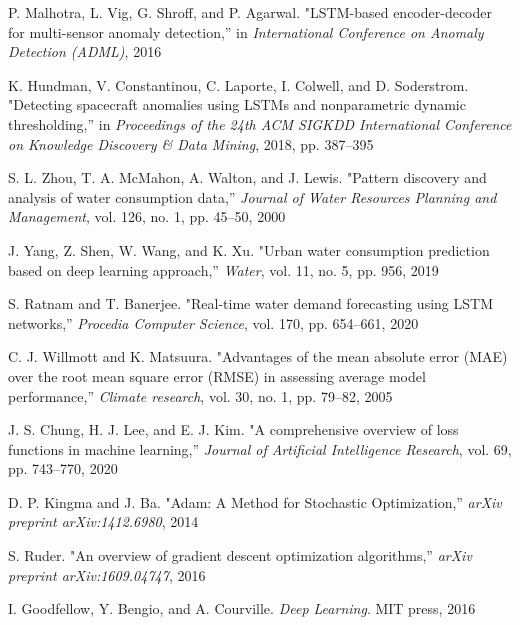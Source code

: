 \begin{thebibliography}{99}
P. Malhotra, L. Vig, G. Shroff, and P. Agarwal. "LSTM-based encoder-decoder for multi-sensor anomaly detection,'' in \textit{International Conference on Anomaly Detection (ADML)}, 2016

K. Hundman, V. Constantinou, C. Laporte, I. Colwell, and D. Soderstrom. "Detecting spacecraft anomalies using LSTMs and nonparametric dynamic thresholding,'' in \textit{Proceedings of the 24th ACM SIGKDD International Conference on Knowledge Discovery \& Data Mining}, 2018, pp. 387--395

S. L. Zhou, T. A. McMahon, A. Walton, and J. Lewis. "Pattern discovery and analysis of water consumption data,'' \textit{Journal of Water Resources Planning and Management}, vol. 126, no. 1, pp. 45--50, 2000

J. Yang, Z. Shen, W. Wang, and K. Xu. "Urban water consumption prediction based on deep learning approach,'' \textit{Water}, vol. 11, no. 5, pp. 956, 2019

S. Ratnam and T. Banerjee. "Real-time water demand forecasting using LSTM networks,'' \textit{Procedia Computer Science}, vol. 170, pp. 654--661, 2020

C. J. Willmott and K. Matsuura. "Advantages of the mean absolute error (MAE) over the root mean square error (RMSE) in assessing average model performance,'' \textit{Climate research}, vol. 30, no. 1, pp. 79--82, 2005

J. S. Chung, H. J. Lee, and E. J. Kim. "A comprehensive overview of loss functions in machine learning,'' \textit{Journal of Artificial Intelligence Research}, vol. 69, pp. 743--770, 2020

D. P. Kingma and J. Ba. "Adam: A Method for Stochastic Optimization,'' \textit{arXiv preprint arXiv:1412.6980}, 2014

S. Ruder. "An overview of gradient descent optimization algorithms,'' \textit{arXiv preprint arXiv:1609.04747}, 2016

I. Goodfellow, Y. Bengio, and A. Courville. \textit{Deep Learning}. MIT press, 2016

\end{thebibliography}

% 
% 
% 

